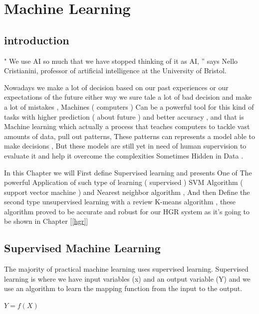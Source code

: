 
\chapter{Machine Learning} \label{ML}

\section{introduction}

" We use AI so much that we have stopped thinking of it as AI, ”  says Nello Cristianini,  professor of artificial  intelligence at the University of Bristol.

Nowadays we make a lot of decision based on our past experiences  or our expectations of the future either way we sure tale  a lot of bad decision and make a lot of mistakes , Machines ( computers ) Can be a powerful tool for this kind of tasks with higher prediction ( about future )  and better accuracy , and that is Machine learning which actually a process  that teaches computers to tackle vast amounts of data, pull out patterns, These patterns can represents a model able to  make decisions , But these models are still yet in need of human supervision to evaluate it and help it overcome the complexities Sometimes Hidden in Data .

In this Chapter we will First define Supervised learning and presents One of The powerful Application of such type of learning ( supervised ) SVM Algorithm ( support vector machine )  and Nearest neighbor algorithm , And then Define the second type unsupervised learning   with a review K-means algorithm , these algorithm  proved  to be accurate and robust  for our HGR system as it's going to be shown in  Chapter  [\ref{hgr}]

\section{Supervised Machine Learning}

The majority of practical machine learning uses supervised learning.
Supervised learning is where we have input variables (x) and an output variable (Y) and we use an algorithm to learn the mapping function from the input to the output.

$Y = f(X)$


